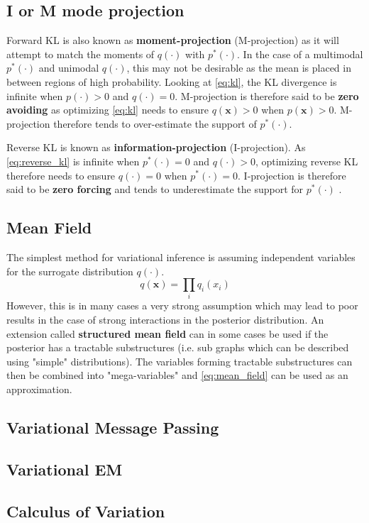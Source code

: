 \subsection{I or M mode projection}

Forward KL is also known as \textbf{moment-projection} (M-projection)  as it will attempt to match the moments of $q(\cdot)$ with $p^*(\cdot)$. In the case of a multimodal $p^*(\cdot)$ and unimodal $q(\cdot)$, this may not be desirable as the mean is placed in between regions of high probability. Looking at \cref{eq:kl}, the KL divergence is infinite when $p(\cdot) > 0$ and $q(\cdot) = 0$. M-projection is therefore said to be \textbf{zero avoiding} as optimizing \cref{eq:kl} needs to ensure $q(\mathbf{x}) > 0$ when $p(\mathbf{x}) > 0$. M-projection therefore tends to over-estimate the support of $p^*(\cdot)$.

Reverse KL is known as \textbf{information-projection} (I-projection). As \cref{eq:reverse_kl} is infinite when $p^*(\cdot) = 0$ and $q(\cdot) > 0$, optimizing reverse KL therefore needs to ensure $q(\cdot) = 0$ when $p^*(\cdot)=0$. I-projection is therefore said to be \textbf{zero forcing} and tends to underestimate the support for $p^*(\cdot)$ \cite{murphy}. 

\subsection{Mean Field}
The simplest method for variational inference is assuming independent variables for the surrogate distribution $q(\cdot)$. 
\begin{equation}\label{eq:mean_field}
    q(\mathbf{x}) = \prod_i q_i(x_i)
\end{equation}
However, this is in many cases a very strong assumption which may lead to poor results in the case of strong interactions in the posterior distribution. An extension called \textbf{structured mean field} can in some cases be used if the posterior has a tractable substructures (i.e. sub graphs which can be described using "simple" distributions). The variables forming tractable substructures can then be combined into "mega-variables" and \cref{eq:mean_field} can be used as an approximation.   

\subsection{Variational Message Passing}
\subsection{Variational EM}



\subsection{Calculus of Variation}